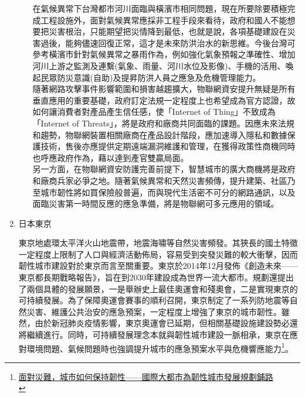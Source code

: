 \documentclass[a4paper,12pt]{article}
\begin{document}
\begin{enumerate}
\begin{enumerate}
在氣候異常下台灣都市河川面臨與橫濱市相同問題，現在所要除要積極完成工程設施外，面對氣候異常應採非工程手段來看待，政府和國人不能想要把災害根治，只能期望把災情降到最低，也就是說，各項基礎建設在災害過後，能夠儘速回復正常，這才是未來防洪治水的新思維。今後台灣可參考橫濱市針對氣候異常之暴雨作為，例如強化氣象預報之準確性、增加河川上游之監測及連繫(氣象、雨量、河川水位及影像)、手機的活用、喚起民眾防災意識(自助)及提昇防洪人員之應急及危機管理能力。\\

隨著網路攻擊事件影響範圍和損害越趨擴大，物聯網資安提升無疑是所有垂直應用的重要基礎，政府訂定法規一定程度上也希望成為官方認證，故如何讓消費者對產品產生信任感，使「Internet of Thing」不致成為「Internet of Threats」，將是政府和廠商共同面臨的課題。因應未來法規和趨勢，物聯網裝置相關廠商在產品設計階段，應加速導入隱私和數據保護技術，售後亦應提供定期遠端漏洞維護和管理，在獲得政策性商機同時也呼應政府作為，藉以達到產官雙贏局面。\\

另一方面，在物聯網資安防護完善前提下，智慧城市的廣大商機將是政府和廠商兵家必爭之地。隨著氣候異常和天然災害頻傳，提升建築、社區乃至城市韌性將如買保險般普遍，而與現代生活密不可分的網路通訊，以及面臨災害第一時間反應的應急準備，將是物聯網可多元應用的領域。\\
\end{enumerate}

\item 日本東京
\label{sec:orgb6c07d6}

東京地處環太平洋火山地震帶，地震海嘯等自然災害頻發。其狹長的國土特徵一定程度上限制了人口與經濟活動佈局，容易受到突發災難的較大衝擊，因而韌性城市建設對於東京而言至關重要。東京於2014年12月發佈《創造未來——東京都長期戰略報告》，旨在到2030年建設成為世界一流大都市。規劃還提出了兩個具體的發展願景，一是舉辦史上最佳奧運會和殘奧會，二是實現東京的可持續發展。為了保障奧運會賽事的順利召開，東京制定了一系列防地震等自然災害、維護公共治安的應急預案，一定程度上增強了東京的城市韌性。雖然，由於新冠肺炎疫情影響，東京奧運會已延期，但相關基礎設施建設勢必還將繼續進行。同時，可持續發展理念本就與韌性城市建設一脈相承，東京在應對環境問題、氣候問題時也強調提升城市的應急預案水平與危機響應能力\footnote{\href{https://news.gmw.cn/2020-04/09/content\_33725150.htm?from=search}{面對災難，城市如何保持韌性——國際大都市為韌性城市發展規劃鋪路}\\\label{org3540bed}}。\\


\end{enumerate}
\end{document}
